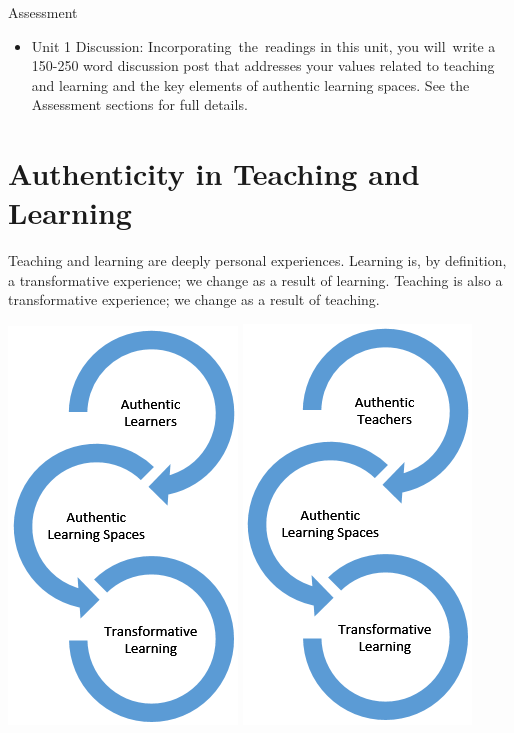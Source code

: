 \documentclass[
]{book}
\providecommand{\tightlist}{%
  \setlength{\itemsep}{0pt}\setlength{\parskip}{0pt}}
\begin{document}
\begin{assessment}
{Assessment}

\begin{itemize}
\tightlist
\item
  Unit 1 Discussion: Incorporating~the~readings in this unit, you
  will~write a 150-250 word discussion post that addresses your values
  related to teaching and learning and the key elements of authentic
  learning spaces. See the Assessment sections for full details.
\end{itemize}
\end{assessment}

\hypertarget{authenticity-in-teaching-and-learning}{%
\section{Authenticity in Teaching and Learning}\label{authenticity-in-teaching-and-learning}}

Teaching and learning are deeply personal experiences. Learning is, by definition, a transformative experience; we change as a result of learning. Teaching is also a transformative experience; we change as a result of teaching.

\includegraphics{assets/unit1/664-authentic-learners.png} \includegraphics{assets/unit1/664-authentic-teachers.png}
\end{document}
